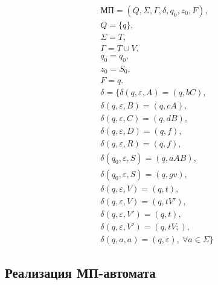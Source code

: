 \documentclass[12pt]{extarticle}
\begin{document}
	\begin{gather*}
		\text{МП} = (Q, \Sigma, \Gamma, \delta, q_0, z_0, F), \\
		Q = \{q\}, \\
		\Sigma = T, \\
		\Gamma = T \cup V. \\
		q_0 = q_0, \\
		z_0 = S_0, \\
		F = {q}. \\
		\delta = \{
		\delta(q, \varepsilon, A) = (q, bC), \\
		\delta(q, \varepsilon, B) = (q, cA), \\
		\delta(q, \varepsilon, C) = (q, dB), \\
		\delta(q, \varepsilon, D) = (q, f), \\
		\delta(q, \varepsilon, R) = (q, f), \\
		\delta(q_0, \varepsilon, S) = (q, aAB), \\
		\delta(q_0, \varepsilon, S) = (q, gv), \\
		\delta(q, \varepsilon, V) = (q, t), \\
		\delta(q, \varepsilon, V) = (q, tV'), \\
		\delta(q, \varepsilon, V') = (q, t), \\
		\delta(q, \varepsilon, V') = (q, tV;), \\
		\delta(q, a, a) = (q, \varepsilon), \: \forall a \in \Sigma
		\}
	\end{gather*}
	
	\subsection{Реализация МП-автомата}
	
\end{document}
